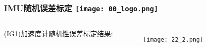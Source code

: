   
  



\begin{comment}
\end{comment}
\begin{frame}
\frametitle{IMU随机误差标定 \hfill \texttt{[image: 00\_logo.png]}}
\begin{columns}
  

  (IG1)加速度计随机性误差标定结果:
  \begin{figure}[h]
		\texttt{[image: 22\_2.png]}
  \end{figure}
  

\end{columns}
\end{frame}
